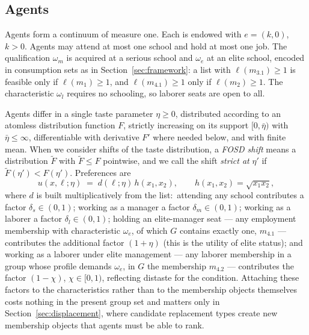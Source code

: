 \documentclass[12pt,letterpaper]{article}
\theoremstyle{definition}
\begin{document}
\subsection{Agents}

Agents form a continuum of measure one.
Each is endowed with $e=(k,0)$, $k>0$.
Agents may attend at most one school and hold at most one job.
The qualification $\omega_m$ is acquired at a serious school and $\omega_e$ at an elite school, encoded in consumption sets as in Section~\ref{sec:framework}: a list with $\ell(m_{3.1})\geq 1$ is feasible only if $\ell(m_1)\geq 1$, and $\ell(m_{4.1})\geq 1$ only if $\ell(m_2)\geq 1$.
The characteristic $\omega_l$ requires no schooling, so laborer seats are open to all.

Agents differ in a single taste parameter $\eta\geq 0$, distributed according to an atomless distribution function $F$, strictly increasing on its support $[0,\bar\eta)$ with $\bar\eta\leq\infty$, differentiable with derivative $F'$ where needed below, and with finite mean.
When we consider shifts of the taste distribution, a \emph{FOSD shift} means a distribution $\tilde F$ with $\tilde F\leq F$ pointwise, and we call the shift \emph{strict at} $\eta'$ if $\tilde F(\eta')<F(\eta')$.
Preferences are
\begin{equation}\label{eq:utility}
  u(x,\ell;\eta) \;=\; d(\ell;\eta)\, h(x_1,x_2),
  \qquad h(x_1,x_2)=\sqrt{x_1 x_2},
\end{equation}
where $d$ is built multiplicatively from the list:\ attending any school contributes a factor $\delta_s\in(0,1)$; working as a manager a factor $\delta_m\in(0,1)$; working as a laborer a factor $\delta_l\in(0,1)$; holding an elite-manager seat --- any employment membership with characteristic $\omega_e$, of which $G$ contains exactly one, $m_{4.1}$ --- contributes the additional factor $(1+\eta)$ (this is the utility of elite status); and working as a laborer under elite management --- any laborer membership in a group whose profile demands $\omega_e$, in $G$ the membership $m_{4.2}$ --- contributes the factor $(1-\chi)$, $\chi\in[0,1)$, reflecting distaste for the condition.
Attaching these factors to the characteristics rather than to the membership objects themselves costs nothing in the present group set and matters only in Section~\ref{sec:displacement}, where candidate replacement types create new membership objects that agents must be able to rank.
\end{document}
